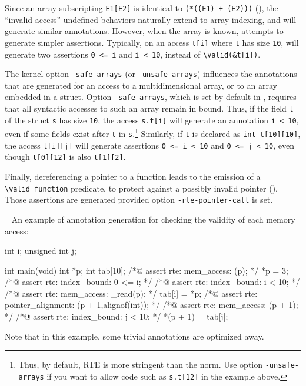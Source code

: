 Since an array subscripting \lstinline|E1[E2]| is identical to
\lstinline|(*((E1) + (E2)))| (), the ``invalid
access'' undefined behaviors naturally extend to array indexing, and \rte{} will
generate similar annotations.  However, when the array is known, \rte{} attempts
to generate simpler assertions.  Typically, on an access \lstinline|t[i]| where
\lstinline|t| has size \lstinline|10|, \rte{} will generate two assertions
\lstinline|0 <= i| and \lstinline|i < 10|, instead of \lstinline|\valid(&t[i])|.

The kernel option \lstinline|-safe-arrays| (or \lstinline|-unsafe-arrays|)
influences the annotations that are generated for an access to a
multidimensional array, or to an array embedded in a struct.  Option
\lstinline|-safe-arrays|, which is set by default in \framac{}, requires that all
syntactic accesses to such an array remain in bound. Thus, if the field
\lstinline|t| of the struct \lstinline|s| has size \lstinline|10|, the access
\lstinline|s.t[i]| will generate an annotation \lstinline|i < 10|, even if some
fields exist after \lstinline|t| in \lstinline|s|.\footnote{ Thus, by default,
  RTE is more stringent than the norm. Use option \lstinline|-unsafe-arrays| if
  you want to allow code such as \lstinline|s.t[12]| in the example above.}
Similarly, if \lstinline|t| is declared as \lstinline|int t[10][10]|, the access
\lstinline|t[i][j]| will generate assertions \lstinline|0 <= i < 10| and
\lstinline|0 <= j < 10|, even though \lstinline|t[0][12]| is also
\lstinline|t[1][2]|.

Finally, dereferencing a pointer to a function leads to the emission of
a \lstinline|\valid_function| predicate, to protect against a possibly
invalid pointer (). Those assertions are generated provided
option \lstinline|-rte-pointer-call| is set.

\begin{example} ~
An example of \rte{} annotation generation for checking the validity of each
memory access:
\begin{listing-nonumber}
int i;
unsigned int j;

int main(void)
{
  int *p;
  int tab[10];
  /*@ assert rte: mem_access: \valid(p); */
  *p = 3;
  /*@ assert rte: index_bound: 0 <= i; */
  /*@ assert rte: index_bound: i < 10; */
  /*@ assert rte: mem_access: \valid_read(p); */
  tab[i] = *p;
  /*@ assert rte: pointer_alignment: \aligned(p + 1,alignof(int)); */
  /*@ assert rte: mem_access: \valid(p + 1); */
  /*@ assert rte: index_bound: j < 10; */
  *(p + 1) = tab[j];
}
\end{listing-nonumber}
Note that in this example, some trivial annotations are optimized away.
\end{example}

